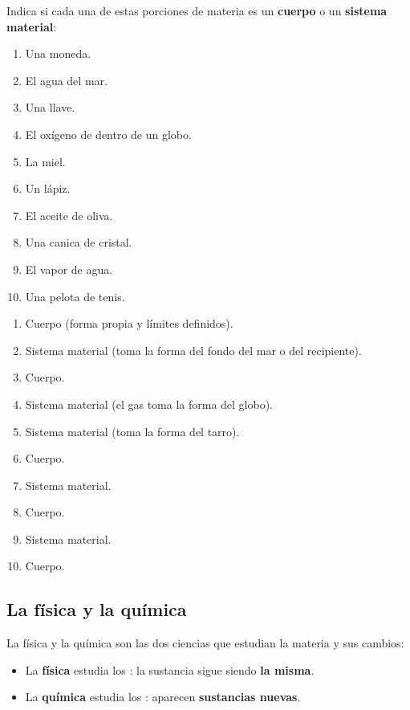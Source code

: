 \begin{exercise}
    Indica si cada una de estas porciones de materia es un \textbf{cuerpo} o un \textbf{sistema material}:
    \begin{enumerate}[label=\letraminuscula]
        \item Una moneda.
        \item El agua del mar.
        \item Una llave.
        \item El oxígeno de dentro de un globo.
        \item La miel.
        \item Un lápiz.
        \item El aceite de oliva.
        \item Una canica de cristal.
        \item El vapor de agua.
        \item Una pelota de tenis.
    \end{enumerate}
    \begin{solu}
        \begin{enumerate}[label=\alph*)]
            \item Cuerpo (forma propia y límites definidos).
            \item Sistema material (toma la forma del fondo del mar o del recipiente).
            \item Cuerpo.
            \item Sistema material (el gas toma la forma del globo).
            \item Sistema material (toma la forma del tarro).
            \item Cuerpo.
            \item Sistema material.
            \item Cuerpo.
            \item Sistema material.
            \item Cuerpo.
        \end{enumerate}
    \end{solu}
\end{exercise}

\subsection{La física y la química}

La física y la química son las dos ciencias que estudian la materia y sus cambios:

\begin{itemize}
    \item La \textbf{física} estudia los : la sustancia sigue siendo \textbf{la misma}.
    \item La \textbf{química} estudia los : aparecen \textbf{sustancias nuevas}.
\end{itemize}

